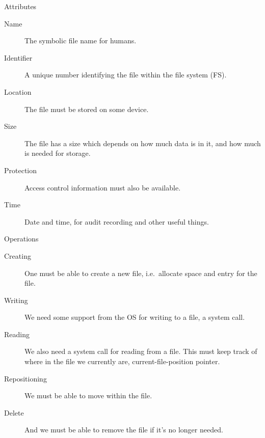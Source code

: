 \documentclass{beamer}
\begin{document}
\begin{frame}{\insertsubsectionhead}{Attributes}
  \begin{description}
    \item[Name] The symbolic file name for humans.

    \item[Identifier] A unique number identifying the file within the file 
      system (FS).

    \item[Location] The file must be stored on some device.

    \item[Size] The file has a size which depends on how much data is in it, 
      and how much is needed for storage.

    \item[Protection] Access control information must also be available.

    \item[Time] Date and time, for audit recording and other useful things.

  \end{description}
\end{frame}

\begin{frame}{\insertsubsectionhead}{Operations}
  \begin{description}
    \item[Creating] One must be able to create a new file, i.e.\ allocate space 
      and entry for the file.

    \item[Writing] We need some support from the OS for writing to a file, 
      a system call.

    \item[Reading] We also need a system call for reading from a file.
      This must keep track of where in the file we currently are, 
      current-file-position pointer.

    \item[Repositioning] We must be able to move within the file.

    \item[Delete] And we must be able to remove the file if it's no longer 
      needed.

  \end{description}
\end{frame}
\end{document}

